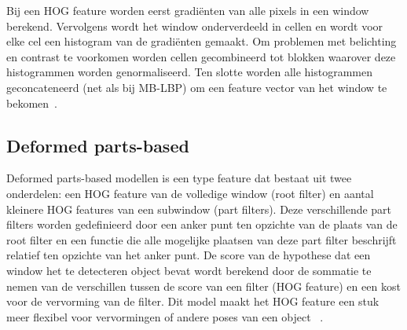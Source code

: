 Bij een HOG feature worden eerst gradi\"enten van alle pixels in een window berekend. Vervolgens wordt het window onderverdeeld in cellen en wordt voor elke cel een histogram van de gradi\"enten gemaakt. Om problemen met belichting en contrast te voorkomen worden cellen gecombineerd tot blokken waarover deze histogrammen worden genormaliseerd. Ten slotte worden alle histogrammen geconcateneerd (net als bij MB-LBP) om een feature vector van het window te bekomen~\cite{dalal2005histograms}.

%

\subsection{Deformed parts-based} \label{sec:feat_part}
Deformed parts-based modellen is een type feature dat bestaat uit twee onderdelen: een HOG feature van de volledige window (root filter) en aantal kleinere HOG features van een subwindow (part filters). Deze verschillende part filters worden gedefinieerd door een anker punt ten opzichte van de plaats van de root filter en een functie die alle mogelijke plaatsen van deze part filter beschrijft relatief ten opzichte van het anker punt. De score van de hypothese dat een window het te detecteren object bevat wordt berekend door de sommatie te nemen van de verschillen tussen de score van een filter (HOG feature) en een kost voor de vervorming van de filter. Dit model maakt het HOG feature een stuk meer flexibel voor vervormingen of andere poses van een object ~\cite{felzenszwalb2010object}.


